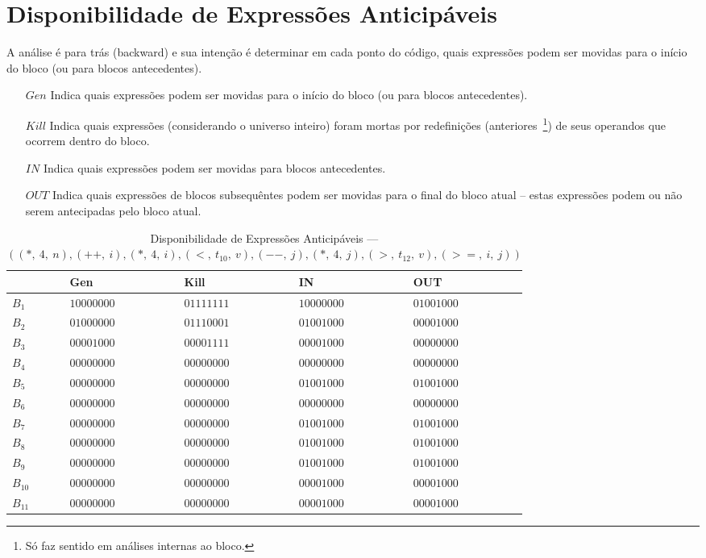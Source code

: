 \section{Disponibilidade de Express\~oes Anticip\'aveis}

A an\'alise \'e para tr\'as (\textsf{backward}) e sua inten\c{c}\~ao \'e determinar em cada ponto do c\'odigo, quais express\~oes podem ser movidas para o in\'icio do bloco (ou para blocos antecedentes).
\begin{itemize}
  \item[$Gen$] Indica quais express\~oes podem ser movidas para o in\'icio do bloco (ou para blocos antecedentes).
  \item[$Kill$] Indica quais express\~oes (considerando o universo inteiro) foram mortas por redefini\c{c}\~oes (anteriores~\footnote{S\'o faz sentido em an\'alises internas ao bloco.}) de seus operandos que ocorrem dentro do bloco.
  \item[$IN$] Indica quais express\~oes podem ser movidas para blocos antecedentes.
  \item[$OUT$] Indica quais express\~oes de blocos subsequ\^entes podem ser movidas para o final do bloco atual -- estas express\~oes podem ou n\~ao serem antecipadas pelo bloco atual.
\end{itemize}

\begin{table}[ht]
\centering
\begin{tabular}{l|l|l|l|l}
	& Gen & Kill & IN & OUT\\
\hline
$B_{1}$ &  $10000000$ & $01111111$ & $10000000$ & $01001000$\\
$B_{2}$ &  $01000000$ & $01110001$ & $01001000$ & $00001000$\\
$B_{3}$ &  $00001000$ & $00001111$ & $00001000$ & $00000000$\\
$B_{4}$ &  $00000000$ & $00000000$ & $00000000$ & $00000000$\\
$B_{5}$ &  $00000000$ & $00000000$ & $01001000$ & $01001000$\\
$B_{6}$ &  $00000000$ & $00000000$ & $00000000$ & $00000000$\\
$B_{7}$ &  $00000000$ & $00000000$ & $01001000$ & $01001000$\\
$B_{8}$ &  $00000000$ & $00000000$ & $01001000$ & $01001000$\\
$B_{9}$ &  $00000000$ & $00000000$ & $01001000$ & $01001000$\\
$B_{10}$ &  $00000000$ & $00000000$ & $00001000$ & $00001000$\\
$B_{11}$ &  $00000000$ & $00000000$ & $00001000$ & $00001000$\\
\end{tabular}
\caption{Disponibilidade de Express\~oes Anticip\'aveis --- $((*,\:4,\:n), (++,\:i), (*,\:4,\:i), (<,\:t_{10},\:v), (--,\:j), (*,\:4,\:j), (>,\:t_{12},\:v), (>=,\:i,\:j))$}
\end{table}

